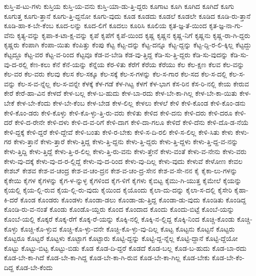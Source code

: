 {ಕುಸ್ತಿ-ಪ-ಟು-ಗಳು
ಕುಸ್ತಿಯ
ಕುಸ್ತಿ-ಯ-ವನು
ಕುಸ್ತಿ-ಯಾ-ಡು-ತ್ತಿ-ದ್ದರು
ಕೂಗಾಟ
ಕೂಗಿ
ಕೂಗಿದ
ಕೂಗಿದೆ
ಕೂಗು
ಕೂಗುತ್ತ
ಕೂಗು-ತ್ತಾನೆ
ಕೂಗು-ತ್ತಿ-ದ್ದನೋ
ಕೂಗು-ವುದು
ಕೂಡ
ಕೂಡದು
ಕೂಡಲೆ
ಕೂಡಲೇ
ಕೂಡಿದ
ಕೂಡಿ-ರು-ತ್ತಾನೆ
ಕೂಡಿ-ಹಾ-ಕ-ಬೇ-ಕೆಂಬ
ಕೂದ-ಲನ್ನು
ಕೂದ-ಲಿಗೆ
ಕೂದಲು
ಕೂರಿಸಿ
ಕೂಲಿಯ
ಕೃತ-ಜ್ಞ-ತೆ-ಯಿಂದ
ಕೃತ-ಜ್ಞ-ನಾ-ಗು-ವೆನು
ಕೃತ್ಯ-ವನ್ನು
ಕೃಪಾ-ಕ-ಟಾ-ಕ್ಷ-ವನ್ನು
ಕೃಪೆ
ಕೃಪೆಗೆ
ಕೃಪೆ-ಯಿಂದ
ಕೃಷ್ಣ
ಕೃಷ್ಣನ
ಕೃಷ್ಣ-ನಿಗೆ
ಕೃಷ್ಣನು
ಕೃಷ್ಣ-ರಾ-ಗಿ-ದ್ದರು
ಕೃಷ್ಣರು
ಕೆಂಪಾಗಿ
ಕೆಂಪಾ-ಯಿತು
ಕೆಂಪಿತ್ತು
ಕೆಂಪು
ಕೆಟ್ಟ
ಕೆಟ್ಟ-ದನ್ನು
ಕೆಟ್ಟ-ದನ್ನೂ
ಕೆಟ್ಟ-ದ್ದನ್ನು
ಕೆಟ್ಟ-ದ್ದಿ-ರ-ಲಿ-ಕ್ಕಿಲ್ಲ
ಕೆಟ್ಟದ್ದು
ಕೆಟ್ಟದ್ದೂ
ಕೆಟ್ಟ-ವರ
ಕೆಟ್ಟ-ವ-ರಿಂದ
ಕೆಟ್ಟವೂ
ಕೆಡ-ವ-ಬೇಡಿ
ಕೆಡ-ವು-ತ್ತಿದ್ದ
ಕೆಡಿ-ಸು-ತ್ತಿ-ದ್ದರು
ಕೆಡಿ-ಸು-ವುದನ್ನು
ಕೆಡಿ-ಸು-ವು-ದ-ರಲ್ಲಿ
ಕೆಣ-ಕಲು
ಕೆನೆ
ಕೆನೆ-ಯನ್ನು
ಕೆನ್ನೆಯ
ಕೆರ-ಳಿತು
ಕೆರೆಗೆ
ಕೆರೆಯ
ಕೆರೆಯು
ಕೆಲ
ಕೆಲ-ಕ್ಷಣ
ಕೆಲವ
ಕೆಲ-ವನ್ನು
ಕೆಲ-ವರ
ಕೆಲ-ವರು
ಕೆಲವು
ಕೆಲಸ
ಕೆಲ-ಸಕ್ಕೂ
ಕೆಲ-ಸಕ್ಕೆ
ಕೆಲ-ಸ-ಗಳನ್ನು
ಕೆಲ-ಸ-ಗಾರ
ಕೆಲ-ಸದ
ಕೆಲ-ಸ-ದಲ್ಲಿ
ಕೆಲ-ಸ-ವನ್ನು
ಕೆಲ-ಸ-ವ-ನ್ನೆಲ್ಲ
ಕೆಲ-ಸ-ವನ್ನೇ
ಕೆಳಕ್ಕೆ
ಕೆಳ-ಗಡೆ
ಕೆಳ-ಗಿಟ್ಟ
ಕೆಳಗೆ
ಕೆಳ-ಭಾಗ
ಕೆಸ-ರಿನ
ಕೆಸ-ರಿ-ನಲ್ಲಿ
ಕೇಯ
ಕೇರುವ
ಕೇರೆ
ಕೇರೆ-ಹಾ-ವಿನ
ಕೇಳದೆ
ಕೇಳ-ಬಲ್ಲ
ಕೇಳ-ಬ-ಹುದು
ಕೇಳ-ಬಾ-ರದು
ಕೇಳ-ಬೇ-ಕಾ-ಗಿಲ್ಲ
ಕೇಳ-ಬೇ-ಕಾ-ಯಿತು
ಕೇಳ-ಬೇಕೆ
ಕೇಳ-ಬೇ-ಕೆಂದು
ಕೇಳ-ಬೇ-ಕೆಂಬ
ಕೇಳ-ಬೇಡ
ಕೇಳ-ಲಿಲ್ಲ
ಕೇಳಲು
ಕೇಳಲೆ
ಕೇಳಿ
ಕೇಳಿ-ಕೊಂಡ
ಕೇಳಿ-ಕೊಂ-ಡನು
ಕೇಳಿ-ಕೊಂ-ಡರು
ಕೇಳಿ-ಕೊಳ್ಳು
ಕೇಳಿ-ಕೊ-ಳ್ಳು-ತ್ತಿ-ರು-ವರು
ಕೇಳಿತು
ಕೇಳಿದ
ಕೇಳಿ-ದನು
ಕೇಳಿ-ದರು
ಕೇಳಿ-ದರೂ
ಕೇಳಿ-ದರೆ
ಕೇಳಿ-ದ-ರೇನೇ
ಕೇಳಿ-ದಳು
ಕೇಳಿ-ದ-ವ-ರಿಗೆ
ಕೇಳಿ-ದಾಗ
ಕೇಳಿ-ದಾ-ಗಲೂ
ಕೇಳಿದೆ
ಕೇಳಿ-ದೆನು
ಕೇಳಿ-ದೊ-ಡ-ನೆಯೆ
ಕೇಳಿ-ದ್ದಕ್ಕೆ
ಕೇಳಿ-ದ್ದರೆ
ಕೇಳಿ-ದ್ದೇವೆ
ಕೇಳಿ-ಬಂತು
ಕೇಳಿ-ರ-ಬೇಕು
ಕೇಳಿ-ಸ-ದಿ-ರಲಿ
ಕೇಳಿ-ಸ-ಲಿಲ್ಲ
ಕೇಳಿ-ಸಿತು
ಕೇಳು
ಕೇಳು-ಗರ
ಕೇಳು-ತ್ತಾನೆ
ಕೇಳು-ತ್ತಾರೆ
ಕೇಳು-ತ್ತಿದ್ದ
ಕೇಳು-ತ್ತಿ-ದ್ದನು
ಕೇಳು-ತ್ತಿ-ದ್ದರು
ಕೇಳು-ತ್ತಿ-ದ್ದಳು
ಕೇಳು-ತ್ತಿ-ದ್ದ-ವ-ನನ್ನು
ಕೇಳು-ತ್ತಿದ್ದಿ
ಕೇಳು-ತ್ತಿದ್ದೆ
ಕೇಳು-ತ್ತಿ-ರ-ಲಿಲ್ಲ
ಕೇಳು-ತ್ತಿ-ರು-ವನು
ಕೇಳು-ತ್ತೇನೆ
ಕೇಳು-ವಂತೆ
ಕೇಳು-ವ-ನೇನು
ಕೇಳು-ವರು
ಕೇಳು-ವು-ದಕ್ಕೆ
ಕೇಳು-ವು-ದ-ರ-ಲ್ಲಿದ್ದೆ
ಕೇಳು-ವು-ದ-ರಿಂದ
ಕೇಳು-ವು-ದಿಲ್ಲ
ಕೇಳು-ವುದು
ಕೇಳುವೆ
ಕೇಳೋಣ
ಕೇವಲ
ಕೇಶಬ್
ಕೇಶವ
ಕೇಶ-ವ-ಚಂದ್ರ
ಕೇಶ-ವ-ಚಂ-ದ್ರನ
ಕೇಶ-ವ-ಚಂ-ದ್ರ-ಸೇನ
ಕೇಶ-ವ-ಸೇ-ನನ
ಕೈ
ಕೈಕಾ-ಲು-ಗಳನ್ನು
ಕೈಕೇಯಿ
ಕೈಗಳ
ಕೈಗಳನ್ನು
ಕೈಗ-ಳ-ನ್ನುಳ್ಳ
ಕೈಗಳಿಂದ
ಕೈಗ-ಳಿಗೆ
ಕೈಗಳು
ಕೈಬಿಟ್ಟ
ಕೈಮು-ಗಿ-ಯುತ್ತ
ಕೈಮೇಲೆ
ಕೈಯನ್ನು
ಕೈಯಲ್ಲಿ
ಕೈಯ-ಲ್ಲಿ-ರುವ
ಕೈಯ-ಲ್ಲಿ-ರು-ವುದು
ಕೈಯಿಂದ
ಕೈಯೊಂದು
ಕೈಲಾ-ದು-ದನ್ನು
ಕೈಲಾ-ಸ-ದಲ್ಲಿ
ಕೈಸೇರಿ
ಕೈಹಾ-ಕಿ-ದರೆ
ಕೊಂಡ
ಕೊಂಡರು
ಕೊಂಡಳು
ಕೊಂಡಾ-ಡಲು
ಕೊಂಡಾ-ಡು-ತ್ತಿದ್ದ
ಕೊಂಡಾ-ಡು-ವುದು
ಕೊಂಡಿತು
ಕೊಂಡಿದ್ದ
ಕೊಂಡಿ-ರು-ವ-ನಂತೆ
ಕೊಂಡು
ಕೊಂಡೊ-ಯ್ದರು
ಕೊಂದ
ಕೊಂದಾದ
ಕೊಂದು
ಕೊಂದು-ಬಿಟ್ಟೆ
ಕೊಂಬೆ-ಯನ್ನು
ಕೊಂಬೆ-ಯಲ್ಲಿ
ಕೊಕ್ಕರೆ
ಕೊಕ್ಕ-ರೆಗೆ
ಕೊಕ್ಕ-ರೆ-ಯನ್ನು
ಕೊಕ್ಕಿ-ನಲ್ಲಿ
ಕೊಕ್ಕಿ-ನ-ಲ್ಲಿದ್ದ
ಕೊಕ್ಕಿ-ನಿಂದ
ಕೊಚ್ಚಿ-ಕೊಂಡು
ಕೊಚ್ಚಿ-ಕೊಳ್ಳು
ಕೊಚ್ಚಿ-ಕೊ-ಳ್ಳುವ
ಕೊಚ್ಚಿ-ಕೊ-ಳ್ಳು-ವನೇ
ಕೊಚ್ಚಿ-ಕೊ-ಳ್ಳು-ವು-ದಿಲ್ಲ
ಕೊಟ್ಟ
ಕೊಟ್ಟನು
ಕೊಟ್ಟನೆ
ಕೊಟ್ಟರು
ಕೊಟ್ಟರೂ
ಕೊಟ್ಟರೆ
ಕೊಟ್ಟಳು
ಕೊಟ್ಟಾಗ
ಕೊಟ್ಟಾರು
ಕೊಟ್ಟಿ-ದ್ದನ್ನು
ಕೊಟ್ಟಿ-ದ್ದ-ನ್ನೆಲ್ಲ
ಕೊಟ್ಟಿ-ದ್ದಾನೆ
ಕೊಟ್ಟಿ-ದ್ದೆಯೋ
ಕೊಟ್ಟು
ಕೊಟ್ಟು-ಬಿಟ್ಟ
ಕೊಟ್ಟು-ಬಿಡು
ಕೊಡ
ಕೊಡ-ದಿ-ದ್ದರೆ
ಕೊಡದೆ
ಕೊಡ-ಬಲ್ಲ
ಕೊಡ-ಬ-ಹುದು
ಕೊಡ-ಬಾ-ರದು
ಕೊಡ-ಬೇ-ಕಾ-ಗಿದೆ
ಕೊಡ-ಬೇ-ಕಾ-ಗಿದ್ದ
ಕೊಡ-ಬೇ-ಕಾ-ಗಿ-ರುವ
ಕೊಡ-ಬೇ-ಕಾ-ಗಿಲ್ಲ
ಕೊಡ-ಬೇಕು
ಕೊಡ-ಬೇ-ಕೆಂ-ದಿದ್ದ
ಕೊಡ-ಬೇ-ಕೆಂದು
}
